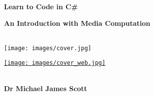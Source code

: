 
\thispagestyle{empty}


\vspace{3cm}
  \begin{center}
	\bfseries \sffamily \Huge Learn to Code in C\# \par
	\bfseries \LARGE An Introduction with Media Computation \par
~\\
	
    \ifpdf
		\texttt{[image: images/cover.jpg]}

	\else
		\href{indexch1.html}{\texttt{[image: images/cover\_web.jpg]}}
    \fi
    
	~\\
	\bfseries \small Dr Michael James Scott\par
  \end{center}

\newpage